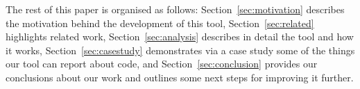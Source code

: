 The rest of this paper is organised as follows: Section~\ref{sec:motivation} describes the motivation behind the 
development of this tool, Section~\ref{sec:related} highlights related work, Section~\ref{sec:analysis} describes in 
detail the tool and how it works, Section~\ref{sec:casestudy} demonstrates via a case study some of the things our 
tool can report about code, and Section~\ref{sec:conclusion} provides our conclusions about our work and outlines 
some next steps for improving it further.
